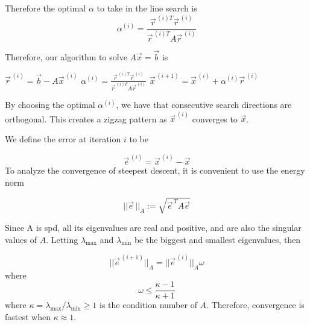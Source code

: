 Therefore the optimal $\alpha$ to take in the line search is
\begin{equation*}
    \alpha^{(i)} = \frac{\vec{r}^{\,(i)T}\vec{r}^{\,(i)}}{\vec{r}^{\,(i)T}A\vec{r}^{\,(i)}}
\end{equation*}

Therefore, our algorithm to solve $A\vec{x}=\vec{b}$ is


\begin{algorithmic}
    \STATE $\vec{r}^{\,(i)} = \vec{b} - A\vec{x}^{\,(i)}$
    \STATE $    \alpha^{(i)} = \frac{\vec{r}^{\,(i)T}\vec{r}^{\,(i)}}{\vec{r}^{\,(i)T}A\vec{r}^{\,(i)}} $
    \STATE $\vec{x}^{\,(i+1)} = \vec{x}^{\,(i)} + \alpha^{(i)}\vec{r}^{\,(i)}$
    \ENDFOR
\end{algorithmic}

By choosing the optimal $\alpha^{(i)}$, we have that consecutive search directions are orthogonal. This creates a zigzag pattern as $\vec{x}^{\,(i)}$ converges to $\vec{x}$.


\begin{center}
    
\end{center}



We define the error at iteration $i$ to be

\begin{equation*}
    \vec{e}^{\,(i)} =\vec{x}^{\,(i)} - \vec{x}
\end{equation*}
To analyze the convergence of steepest descent, it is convenient to use the energy norm

\begin{equation*}
    \lvert\lvert \vec{e}\, \rvert\rvert_A :=\sqrt{\vec{e}^{\,T}A\vec{e}}
\end{equation*}

Since A is spd, all its eigenvalues are real and positive, and are also the singular values of $A$. Letting $\lambda_{\max}$ and $\lambda_{\min}$ be the biggest and smallest eigenvalues, then

\begin{equation*}
    \lvert\lvert \vec{e}^{\,(i+1)} \rvert\rvert_A
    =\lvert\lvert \vec{e}^{\,(i)} \rvert\rvert_A\omega
\end{equation*}
where
\begin{equation*}
    \omega \leq \frac{\kappa - 1}{\kappa+1}
\end{equation*}
where $\kappa = \lambda_{\max}/\lambda_{\min} \geq 1$ is the condition number of $A$. Therefore, convergence is fastest when $\kappa\approx 1$.


